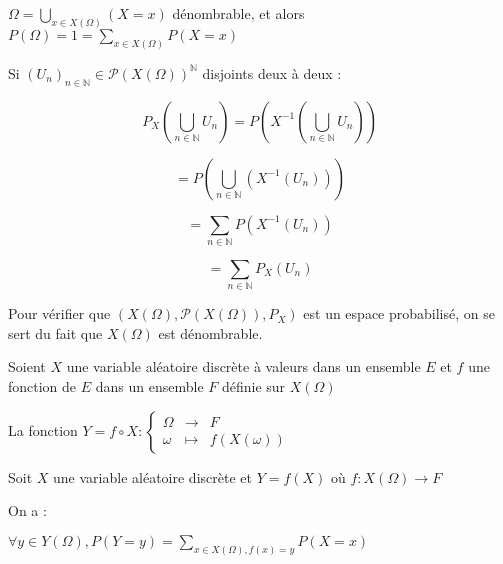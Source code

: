 \documentclass[a4paper,12pt]{book}
\newcommand{\Prop}[2]{\begin{tcolorbox}[sharp corners, colback=white,colframe=red!90!black!75, title=Proposition : #1]#2\end{tcolorbox}}
\newcommand{\Pre}[1]{\begin{tcolorbox}[sharp corners, colback=white,colframe=green!60!green!30!black!75, title=Preuve]#1\end{tcolorbox}}
\def\N{\mathbb{N}}
\begin{document}
\Pre{$\Omega = \bigcup_{x\in X(\Omega)}(X=x)$ dénombrable, et alors $P(\Omega)=1=\sum\limits_{x\in X(\Omega)}P(X=x)$
\par Si $(U_n)_{n\in\N}\in \mathcal{P}(X(\Omega))^\N$ disjoints deux à deux :
\par $$ P_X(\bigcup_{n\in\N}U_n)=P(X^{-1}(\bigcup_{n\in\N}U_n)) $$
\par $$ = P(\bigcup_{n\in\N}(X^{-1}(U_n))) $$
\par $$ = \sum\limits_{n\in\N} P(X^{-1}(U_n))$$
\par $$ = \sum\limits_{n\in\N} P_X(U_n)$$
\par Pour vérifier que $(X(\Omega), \mathcal{P}(X(\Omega)), P_X)$ est un espace probabilisé, on se sert du fait que $X(\Omega)$ est dénombrable.
}


\Prop{}{Soient $X$ une variable aléatoire discrète à valeurs dans un ensemble $E$ et $f$ une fonction de $E$ dans un ensemble $F$ définie sur $X(\Omega)$
\par La fonction $Y=f\circ X :\left\{\begin{array}{rcl}\Omega & \to & F \\ \omega & \mapsto & f(X(\omega))\end{array}\right.$}

\Prop{}{Soit $X$ une variable aléatoire discrète et $Y = f(X)$ où $f:X(\Omega)\to F$
\par On a :\par\begin{center}$\forall y\in Y(\Omega), P(Y=y) = \sum\limits_{x\in X(\Omega), f(x)=y}P(X=x)$\end{center}}
\end{document}
